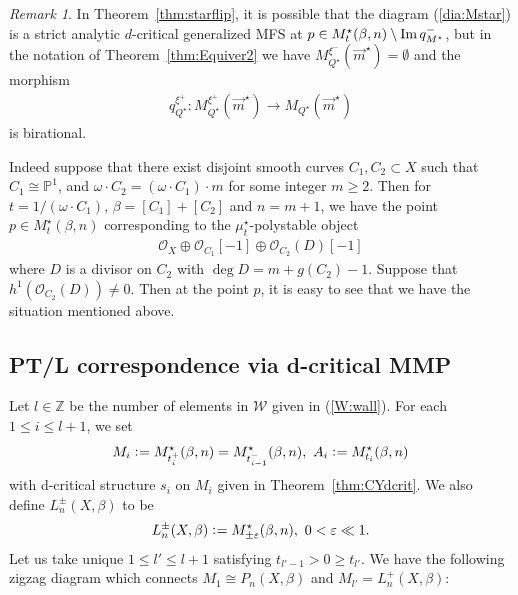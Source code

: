 \documentclass[11pt]{amsart}
\theoremstyle{plain}
\theoremstyle{definition}
\theoremstyle{remark}
\newtheorem{rmk}[thm]{Remark}
\newcommand{\oO}{\mathcal{O}}
\newcommand{\wW}{\mathcal{W}}
\newcommand{\Imm}{\mathop{\rm Im}\nolimits}
\begin{document}
\begin{rmk}\label{rmk:dMFS}
In Theorem~\ref{thm:starflip},
it is possible that 
the diagram (\ref{dia:Mstar})
is a strict analytic $d$-critical generalized MFS
at $p \in M_t^{\star}(\beta, n) \setminus \Imm q_{M^{\star}}^-$,
but in the notation of Theorem~\ref{thm:Equiver2}
we have $M_{Q^{\star}}^{\xi^{-}}(\vec{m}^{\star})=\emptyset$
and the
morphism
\begin{align}\label{rmk:birational}
q_{Q^{\star}}^{\xi^{+}} \colon 
M_{Q^{\star}}^{\xi^{+}}(\vec{m}^{\star})
\to M_{Q^{\star}}(\vec{m}^{\star})
\end{align}
is birational. 

Indeed suppose that there exist disjoint smooth curves
$C_1, C_2 \subset X$
such that $C_1 \cong \mathbb{P}^1$, 
and $\omega \cdot C_2=(\omega \cdot C_1) \cdot m$
for some integer $m\ge 2$.
Then 
for $t=1/(\omega \cdot C_1)$, 
$\beta=[C_1]+[C_2]$ and $n=m+1$, 
we have the point 
$p \in M_t^{\star}(\beta, n)$
corresponding to the $\mu_t^{\star}$-polystable 
object
\begin{align*}
\oO_X \oplus \oO_{C_1}[-1] \oplus \oO_{C_2}(D)[-1]
\end{align*}
where $D$ is a divisor on $C_2$
with 
$\deg D=m+g(C_2)-1$.
Suppose that $h^1(\oO_{C_2}(D)) \neq 0$.
Then at the point $p$,  
it is easy to see that 
we have the situation mentioned above. 
\end{rmk}

\subsection{PT/L correspondence via d-critical MMP}\label{subsec:PT/L}
Let $l \in \mathbb{Z}$ be the number of elements in $\wW$
given in (\ref{W:wall}). 
For each $1\le i \le l+1$, we set
\begin{align*}
M_i \cneq M_{t_i^{+}}^{\star}(\beta, n)=M_{t_{i-1}^{-}}^{\star}(\beta, n), \ 
A_i \cneq M_{t_i}^{\star}(\beta, n)
\end{align*}
with d-critical structure $s_i$ on 
$M_i$ given in Theorem~\ref{thm:CYdcrit}. 
We also define $L_n^{\pm}(X, \beta)$ to be
\begin{align*}
L_{n}^{\pm}(X, \beta) \cneq M_{\pm \varepsilon}^{\star}(\beta, n), \ 
0<\varepsilon \ll 1. 
\end{align*}
Let us take unique 
$1\le l' \le l+1$
satisfying  
$t_{l'-1}>0 \ge t_{l'}$. 
We have the following zigzag diagram 
which connects $M_1 \cong P_n(X, \beta)$ and 
$M_{l'}=L_n^{+}(X, \beta)$:
\end{document}
